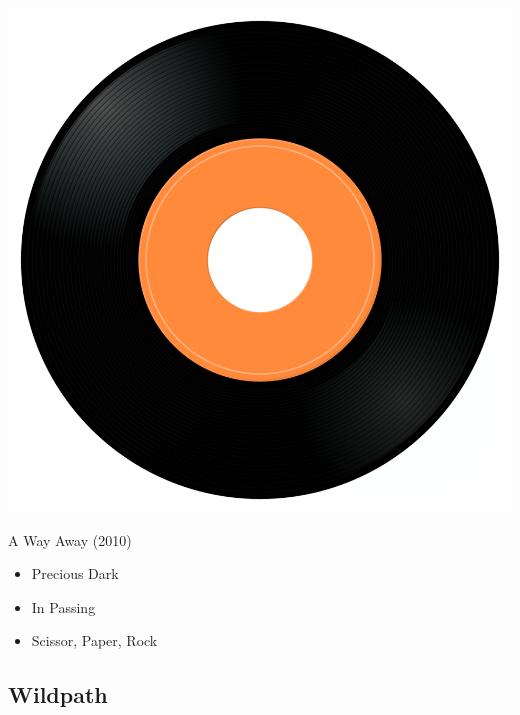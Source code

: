 \begin{minipage}[t]{0.25\textwidth}
\captionsetup{type=figure}
\includegraphics[width=\textwidth]{Images/cover.png}
\caption*{A Way Away (2010)}
\end{minipage}
\begin{minipage}[t]{0.25\textwidth}\vspace{0pt}
\begin{itemize}[nosep,leftmargin=1em,labelwidth=*,align=left]
	\setlength{\itemsep}{0pt}
	\item Precious Dark
	\item In Passing
	\item Scissor, Paper, Rock
\end{itemize}
\end{minipage}

\subsection{Wildpath}

